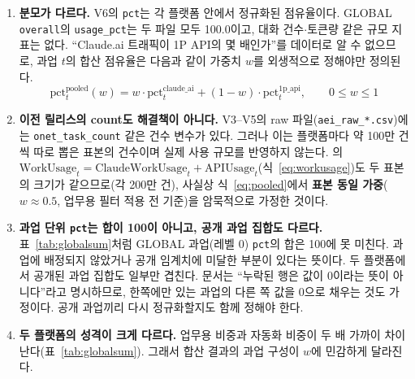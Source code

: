 \documentclass[11pt]{article}
\begin{document}
\begin{enumerate}[label=(\arabic*)]
  \item \textbf{분모가 다르다.} V6의 \texttt{pct}는 각 플랫폼 안에서 정규화된 점유율이다. GLOBAL \texttt{overall}의 \texttt{usage\_pct}는 두 파일 모두 100.0이고, 대화 건수$\cdot$토큰량 같은 규모 지표는 없다. ``Claude.ai 트래픽이 1P API의 몇 배인가''를 데이터로 알 수 없으므로, 과업 $t$의 합산 점유율은 다음과 같이 가중치 $w$를 외생적으로 정해야만 정의된다.
  \begin{equation}
  \text{pct}^{\text{pooled}}_t(w) = w\cdot \text{pct}^{\text{claude\_ai}}_t + (1-w)\cdot \text{pct}^{\text{1p\_api}}_t,\qquad 0\le w\le 1 \label{eq:pooled}
  \end{equation}
  \item \textbf{이전 릴리스의 count도 해결책이 아니다.} V3--V5의 raw 파일(\texttt{aei\_raw\_*.csv})에는 \texttt{onet\_task\_count} 같은 건수 변수가 있다. 그러나 이는 플랫폼마다 약 100만 건씩 따로 뽑은 표본의 건수이며 실제 사용 규모를 반영하지 않는다. \textcite{massenkoff-2026-labor-market-impacts-of-ai}의 $\text{WorkUsage}_t = \text{ClaudeWorkUsage}_t + \text{APIUsage}_t$(식~\eqref{eq:workusage})도 두 표본의 크기가 같으므로(각 200만 건), 사실상 식~\eqref{eq:pooled}에서 \textbf{표본 동일 가중}($w\approx 0.5$, 업무용 필터 적용 전 기준)을 암묵적으로 가정한 것이다.
  \item \textbf{과업 단위 \texttt{pct}는 합이 100이 아니고, 공개 과업 집합도 다르다.} 표~\ref{tab:globalsum}처럼 GLOBAL 과업(레벨 0) \texttt{pct}의 합은 100에 못 미친다. 과업에 배정되지 않았거나 공개 임계치에 미달한 부분이 있다는 뜻이다. 두 플랫폼에서 공개된 과업 집합도 일부만 겹친다. 문서는 ``누락된 행은 값이 0이라는 뜻이 아니다''라고 명시하므로, 한쪽에만 있는 과업의 다른 쪽 값을 0으로 채우는 것도 가정이다. 공개 과업끼리 다시 정규화할지도 함께 정해야 한다.
  \item \textbf{두 플랫폼의 성격이 크게 다르다.} 업무용 비중과 자동화 비중이 두 배 가까이 차이 난다(표~\ref{tab:globalsum}). 그래서 합산 결과의 과업 구성이 $w$에 민감하게 달라진다.
\end{enumerate}
\end{document}
